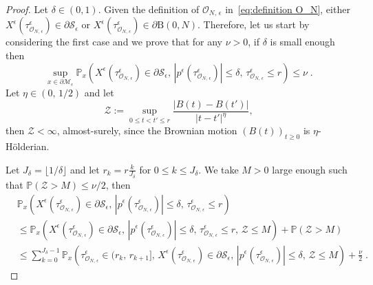 \documentclass[10pt,a4paper]{amsart}
\begin{document}
\begin{proof}

Let $\delta\in(0,1)$. Given the definition of $\mathcal{O}_{N,\,\epsilon}$ in~\eqref{eq:definition O_N}, either $X^{\epsilon}(\tau_{\mathcal{O}_{N,\,\epsilon}}^{\epsilon})\in\partial\mathcal{S}_{\epsilon}$ or $X^{\epsilon}(\tau_{\mathcal{O}_{N,\,\epsilon}}^{\epsilon})\in\partial\mathrm{B}(0,N)$. Therefore, let us start by considering the first case and we prove that for any $\nu>0$, if $\delta$ is small enough then 
\begin{equation}
\sup_{x\in\partial\mathcal{M}_{\epsilon}}\mathbb{P}_{x}\left(X^{\epsilon}(\tau_{\mathcal{O}_{N,\,\epsilon}}^{\epsilon})\in\partial\mathcal{S}_{\epsilon},\,|p^{\epsilon}(\tau_{\mathcal{O}_{N,\,\epsilon}}^{\epsilon})|\leq\delta,\,\tau_{\mathcal{O}_{N,\,\epsilon}}^{\epsilon}\leq r\right)\leq\nu\;.\label{eq:sup proba inward velocity proof}
\end{equation}
Let $\eta\in(0,\,1/2)$ and let
\[
\mathcal{Z}:=\sup_{0\leq t<t'\leq r}\frac{|B(t)-B(t')|}{|t-t'|^{\eta}},
\]
then $\mathcal{Z}<\infty$, almost-surely, since the Brownian motion
$(B(t))_{t\geq0}$ is $\eta$-H\"olderian.

Let $J_\delta=\lfloor1/\delta\rfloor$ and let $r_{k}=r\frac{k}{J_\delta}$ for $0\leq k\leq J_\delta$. We take $M>0$ large enough such that $\mathbb{P}(\mathcal{Z}>M)\leq\nu/2$, then 
\begin{align}
 & \mathbb{P}_{x}\left(X^{\epsilon}(\tau_{\mathcal{O}_{N,\,\epsilon}}^{\epsilon})\in\partial\mathcal{S}_{\epsilon},\,|p^{\epsilon}(\tau_{\mathcal{O}_{N,\,\epsilon}}^{\epsilon})|\leq\delta,\,\tau_{\mathcal{O}_{N,\,\epsilon}}^{\epsilon}\leq r\right)\nonumber \\
 & \leq\mathbb{P}_{x}\left(X^{\epsilon}(\tau_{\mathcal{O}_{N,\,\epsilon}}^{\epsilon})\in\partial\mathcal{S}_{\epsilon},\,|p^{\epsilon}(\tau_{\mathcal{O}_{N,\,\epsilon}}^{\epsilon})|\leq\delta,\,\tau_{\mathcal{O}_{N,\,\epsilon}}^{\epsilon}\leq r,\,\mathcal{Z}\leq M\right)+\mathbb{P}(\mathcal{Z}>M)\nonumber \\
 & \leq\sum_{k=0}^{J_\delta-1}\mathbb{P}_{x}\left(\tau_{\mathcal{O}_{N,\,\epsilon}}^{\epsilon}\in(r_{k},\,r_{k+1}],\,X^{\epsilon}(\tau_{\mathcal{O}_{N,\,\epsilon}}^{\epsilon})\in\partial\mathcal{S}_{\epsilon},\,|p^{\epsilon}(\tau_{\mathcal{O}_{N,\,\epsilon}}^{\epsilon})|\leq\delta,\,\mathcal{Z}\leq M\right)+\frac{\nu}{2}\;.\label{eq:sum interval exit time}
\end{align}


\end{proof}
\end{document}
